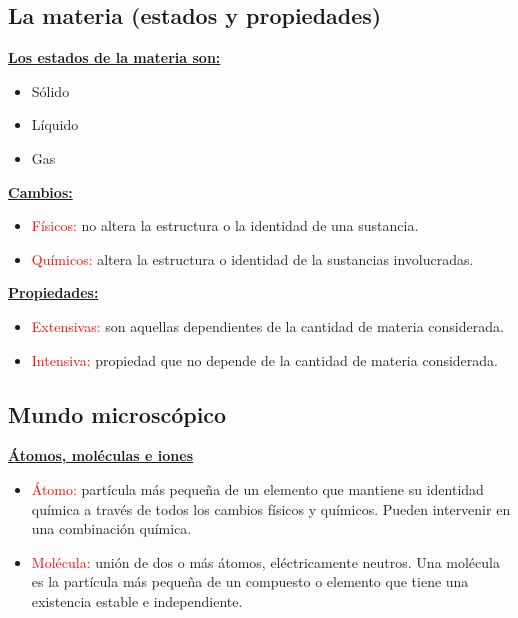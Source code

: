     \subsection{La materia (estados y propiedades)}
        \indent \textbf{\underline{Los estados de la materia son:}}
            \begin{itemize} 
                \item Sólido
                \item Líquido
                \item Gas
            \end{itemize}

        \indent \textbf{\underline{Cambios:}}
            \begin{itemize}
                \item \textcolor{red}{Físicos:} no altera la estructura o la identidad de una sustancia.
                \item \textcolor{red}{Químicos:} altera la estructura o identidad de la sustancias involucradas. 
            \end{itemize} 
        \columnbreak
        \indent \textbf{\underline{Propiedades:}}
            \begin{itemize}
                \item \textcolor{red}{Extensivas:} son aquellas dependientes de la cantidad de materia considerada.
                \item \textcolor{red}{Intensiva:} propiedad que no depende de la cantidad de materia considerada.
            \end{itemize}
            
    \subsection{Mundo microscópico}
        \indent \textbf{\underline{Átomos, moléculas e iones}}
            \begin{itemize}
                \item \textcolor{red}{Átomo:} partícula más pequeña de un elemento que mantiene su identidad química a través de todos los cambios físicos y químicos. Pueden intervenir en una combinación química. 

                \item \textcolor{red}{Molécula:} unión de dos o más átomos, eléctricamente neutros. Una molécula es la partícula más pequeña de un compuesto o elemento que tiene una existencia estable e independiente.
            \end{itemize}

